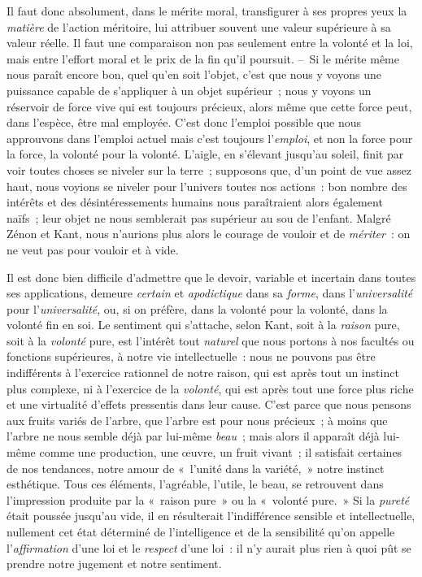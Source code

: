 \documentclass[french,twoside]{book} %
\begin{document}
Il faut donc absolument, dans le mérite moral, transfigurer à ses propres yeux la \emph{matière} de l’action méritoire, lui attribuer souvent une valeur supérieure à sa valeur réelle. Il faut une comparaison non pas seulement entre la volonté et la loi, mais entre l’effort moral et le prix de la fin qu’il poursuit. – Si le mérite même nous paraît encore bon, quel qu’en soit l’objet, c’est que nous y voyons une puissance capable de s’appliquer à un objet supérieur ; nous y voyons un réservoir de force vive qui est toujours précieux, alors même que cette force peut, dans l’espèce, être mal employée. C’est donc l’emploi possible que nous approuvons dans l’emploi actuel mais c’est toujours l’\emph{emploi}, et non la force pour la force, la volonté pour la volonté. L’aigle, en s’élevant jusqu’au soleil, finit par voir toutes choses se niveler sur la terre ; supposons que, d’un point de vue assez haut, nous voyions se niveler pour l’univers toutes nos actions : bon nombre des intérêts et des désintéressements humains nous paraîtraient alors également naïfs ; leur objet ne nous semblerait pas supérieur au sou de l’enfant. Malgré Zénon et Kant, nous n’aurions plus alors le courage de vouloir et de \emph{mériter} : on ne veut pas pour vouloir et à vide.\par
Il est donc bien difficile d’admettre que le devoir, variable et incertain dans toutes ses applications, demeure \emph{certain} et \emph{apodictique} dans sa \emph{forme}, dans l’\emph{universalité} pour l’\emph{universalité}, ou, si on préfère, dans la volonté pour la volonté, dans la volonté fin en soi. Le sentiment qui s’attache, selon Kant, soit à la \emph{raison} pure, soit à la \emph{volonté} pure, est l’intérêt tout \emph{naturel} que nous portons à nos facultés ou fonctions supérieures, à notre vie intellectuelle : nous ne pouvons pas être indifférents à l’exercice rationnel de notre raison, qui est après tout un instinct plus complexe, ni à l’exercice de la \emph{volonté}, qui est après tout une force plus riche et une virtualité d’effets pressentis dans leur cause. C’est parce que nous pensons aux fruits variés de l’arbre, que l’arbre est pour nous précieux ; à moins que l’arbre ne nous semble déjà par lui-même \emph{beau} ; mais alors il apparaît déjà lui-même comme une production, une œuvre, un fruit vivant ; il satisfait certaines de nos tendances, notre amour de « l’unité dans la variété, » notre instinct esthétique. Tous ces éléments, l’agréable, l’utile, le beau, se retrouvent dans l’impression produite par la « raison pure » ou la « volonté pure. » Si la \emph{pureté} était poussée jusqu’au vide, il en résulterait l’indifférence sensible et intellectuelle, nullement cet état déterminé de l’intelligence et de la sensibilité qu’on appelle l’\emph{affirmation} d’une loi et le \emph{respect} d’une loi : il n’y aurait plus rien à quoi pût se prendre notre jugement et notre sentiment.
\end{document}
